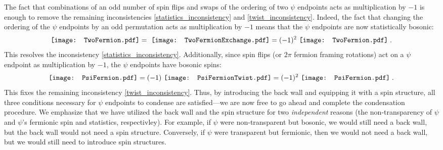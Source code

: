 \documentclass[12pt,a4paper]{article}
\newcommand{\zt}{\mathbb{Z}_2}
\newcommand{\mcf}{\mathcal{F}}
\newcommand{\ethan}[1]{{\color{amethyst}\footnotesize{(EL) #1}}}
\newcommand{\PsiFermion}{\mathord{\vcenter{\hbox{\texttt{[image: PsiFermion.pdf]}}}}}
\newcommand{\PsiFermionTwist}{\mathord{\vcenter{\hbox{\texttt{[image: PsiFermionTwist.pdf]}}}}}
\newcommand{\TwoFermion}{\mathord{\vcenter{\hbox{\texttt{[image: TwoFermion.pdf]}}}}}
\newcommand{\TwoFermionExchange}{\mathord{\vcenter{\hbox{\texttt{[image: TwoFermionExchange.pdf]}}}}}
\begin{document}
The fact that combinations of an odd number of spin flips and swaps of the ordering of two $\psi$ endpoints acts as multiplication by $-1$ is enough to remove the remaining inconsistencies \eqref{statistics_inconsistency} and \eqref{twist_inconsistency}.
Indeed, the fact that changing the ordering of the $\psi$ endpoints by an odd permutation acts as multiplication by $-1$ means that the $\psi$ endpoints are now statistically bosonic:
\begin{align} \label{boxbraidxxx}
\TwoFermion =\ \TwoFermionExchange = (-1)^2\ \TwoFermion\;.
\end{align}
This resolves the inconsistency \eqref{statistics_inconsistency}. Additionally, since spin flips (or $2\pi$ fermion framing rotations) act on a $\psi$ endpoint as multiplication by $-1$, 
the $\psi$ endpoints have bosonic spins:
\begin{align} \label{boxspinxxx}
\PsiFermion = (-1)\ \PsiFermionTwist = (-1)^2\ \PsiFermion\;. 
\end{align}
This fixes the remaining inconsistency \eqref{twist_inconsistency}. 
Thus, by introducing the back wall and equipping it with a spin structure, all three conditions necessary for $\psi$ endpoints to condense are satisfied---we are now free to go ahead and complete the condensation procedure. 
We emphasize that we have utilized the back wall and the spin structure for two {\it independent} reasons (the non-transparency of $\psi$ and $\psi$'s fermionic spin and statistics, respectivley). 
For example, if $\psi$ were non-transparent but bosonic, we would still need a back wall, but the back wall would not need a spin structure.
Conversely, if $\psi$ were transparent but fermionic, then we would not need a back wall, but we would still need to introduce spin
structures.
\end{document}
